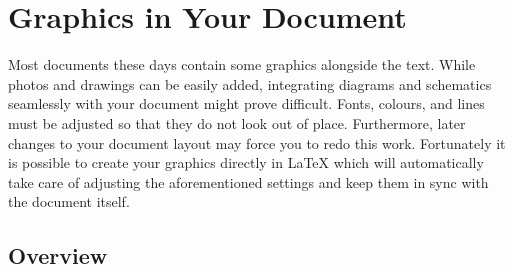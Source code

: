 %
%
%
%

\chapter{Graphics in Your Document}\label{chap:graphics}

\begin{intro}
  Most documents these days contain some graphics alongside the text. While
  photos and drawings can be easily added, integrating diagrams and schematics
  seamlessly with your document might prove difficult. Fonts, colours, and lines
  must be adjusted so that they do not look out of place. Furthermore, later
  changes to your document layout may force you to redo this work. Fortunately
  it is possible to create your graphics directly in \LaTeX{} which will
  automatically take care of adjusting the aforementioned settings and keep
  them in sync with the document itself.
\end{intro}

\section{Overview}

